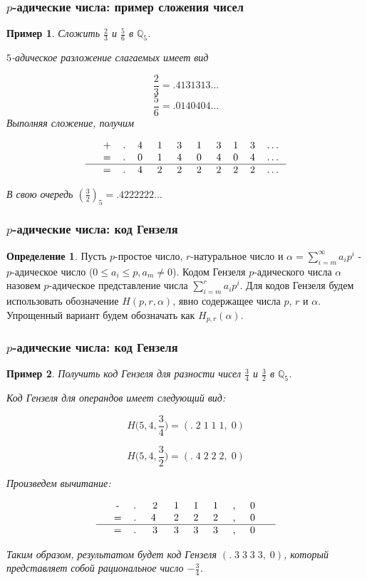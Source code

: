 \documentclass[10pt,professionalfont,utf8,presentation,compress]{beamer}
\theoremstyle{definition}
\newtheorem{defn}{Определение}
\theoremstyle{plain}
\newtheorem{exmp}{Пример}
\begin{document}
\begin{frame}
\frametitle{$p$-адические числа: пример сложения чисел}

\begin{exmp}
Сложить $\frac{2}{3}$ и $\frac{5}{6}$ в $\mathbb{Q}_5$.

\noindent $5$-адическое разложение слагаемых имеет вид

$$
\frac{2}{3}=.4131313\dots
$$
$$
\frac{5}{6}=.0140404\dots
$$
Выполняя сложение, получим

$$
\begin{tabular}{cccccccccccc}
& + & . & 4\; & 1\; & 3\; & 1\; & 3 & 1 & 3 & \dots \\
& = & . & 0\; & 1\; & 4\; & 0\; & 4 & 0 & 4 & \dots \\
\hline
& = & . & 4\; & 2\; & 2\; & 2\; & 2 & 2 & 2 & \dots
\end{tabular}
$$

\noindent В свою очередь $(\frac{3}{2})_5=.4222222\dots$
\end{exmp}
\end{frame}


\begin{frame}
\frametitle{$p$-адические числа: код Гензеля}
\begin{defn}
Пусть $p$-простое число, $r$-натуральное число и $\alpha=\sum\limits^{\infty}_{i=m} a_ip^i$ - $p$-адическое число ($0 \le a_i \le p, a_m \neq 0$). Кодом Гензеля $p$-адического числа $\alpha$ назовем $p$-адическое представление числа $\sum\limits_{i=m}^{r}a_ip^i$. Для кодов Гензеля будем использовать обозначение $H(p,r,\alpha)$, явно содержащее числа $p$, $r$ и $\alpha$. Упрощенный вариант будем обозначать как $H_{p,r}(\alpha)$.
\end{defn}
\end{frame}

\begin{frame}
\frametitle{$p$-адические числа: код Гензеля}
\begin{exmp}
Получить код Гензеля для разности чисел $\frac{3}{4}$ и $\frac{3}{2}$ в $\mathbb{Q}_5$.

\noindent Код Гензеля для операндов имеет следующий вид:

$$H\bigg(5,4, \frac{3}{4}\bigg)=(.\; 2\; 1\; 1\; 1,\; 0)$$

$$H\bigg(5,4, \frac{3}{2}\bigg)=(.\; 4\; 2\; 2\; 2,\; 0)$$


\noindent Произведем вычитание:

$$
\begin{tabular}{ccccccccccc}
& - & .\; & 2\; & 1\; & 1\; & 1\; & ,\; & 0\; &  \\
& = & .\; & 4 \; & 2\; & 2\; & 2\; & ,\; & 0\; &  \\
\hline
& = & .\; & 3\; & 3\; & 3\; & 3\; & ,\; & 0\; &
\end{tabular}
$$

\noindent Таким образом, результатом будет код Гензеля $(.\; 3\; 3\; 3\; 3,\; 0)$, который представляет собой рациональное число $-\frac{3}{4}$.
\end{exmp}
\end{frame}
\end{document}
